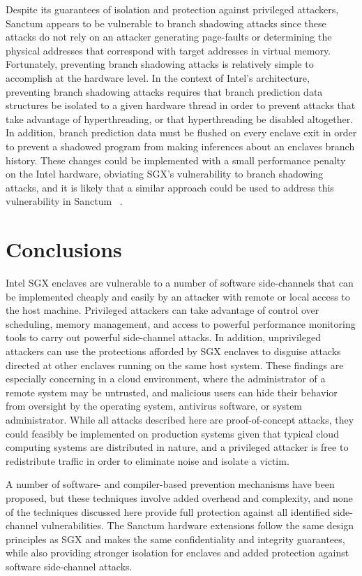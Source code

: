 Despite its guarantees of isolation and protection against privileged attackers, Sanctum appears to be vulnerable to branch shadowing attacks since these attacks do not rely on an attacker generating page-faults or determining the physical addresses that correspond with target addresses in virtual memory. Fortunately, preventing branch shadowing attacks is relatively simple to accomplish at the hardware level. In the context of Intel's architecture, preventing branch shadowing attacks requires that branch prediction data structures be isolated to a given hardware thread in order to prevent attacks that take advantage of hyperthreading, or that hyperthreading be disabled altogether. In addition, branch prediction data must be flushed on every enclave exit in order to prevent a shadowed program from making inferences about an enclaves branch history. These changes could be implemented with a small performance penalty on the Intel hardware, obviating SGX's vulnerability to branch shadowing attacks, and it is likely that a similar approach could be used to address this vulnerability in Sanctum ~\cite{costan_sanctum:_2016, costan_sanctum:_2015, lee_inferring_2017}.

\section{Conclusions}

Intel SGX enclaves are vulnerable to a number of software side-channels that can be implemented cheaply and easily by an attacker with remote or local access to the host machine. Privileged attackers can take advantage of control over scheduling, memory management, and access to powerful performance monitoring tools to carry out powerful side-channel attacks. In addition, unprivileged attackers can use the protections afforded by SGX enclaves to disguise attacks directed at other enclaves running on the same host system. These findings are especially concerning in a cloud environment, where the administrator of a remote system may be untrusted, and malicious users can hide their behavior from oversight by the operating system, antivirus software, or system administrator. While all attacks described here are proof-of-concept attacks, they could feasibly be implemented on production systems given that typical cloud computing systems are distributed in nature, and a privileged attacker is free to redistribute traffic in order to eliminate noise and isolate a victim.

A number of software- and compiler-based prevention mechanisms have been proposed, but these techniques involve added overhead and complexity, and none of the techniques discussed here provide full protection against all identified side-channel vulnerabilities. The Sanctum hardware extensions follow the same design principles as SGX and makes the same confidentiality and integrity guarantees, while also providing stronger isolation for enclaves and added protection against software side-channel attacks. 

